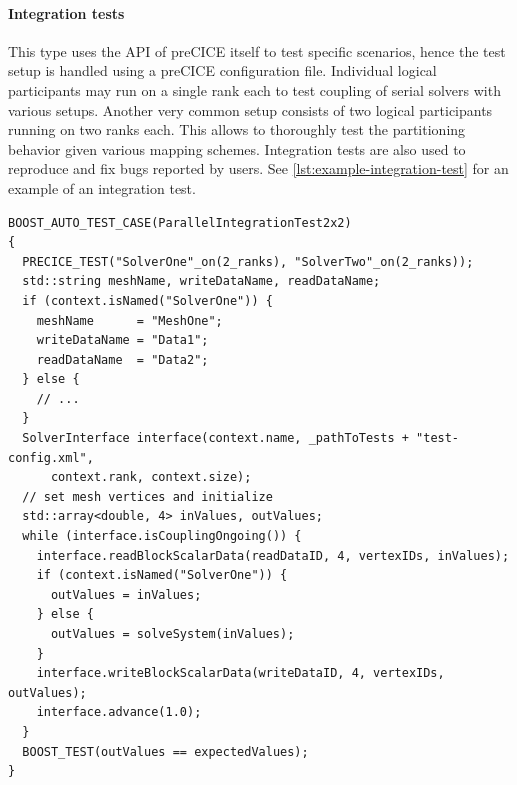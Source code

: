 \paragraph{Integration tests} This type uses the API of preCICE itself to test specific scenarios, hence the test setup is handled using a preCICE configuration file.
Individual logical participants may run on a single rank each to test
coupling of serial solvers with various setups.
Another very common setup consists of two logical participants running on two ranks each.
This allows to thoroughly test the partitioning behavior given various mapping schemes.
Integration tests are also used to reproduce and fix bugs reported by users.
See \autoref{lst:example-integration-test} for an example of an integration test.

\begin{listing}[h!]
\begin{verbatim}
BOOST_AUTO_TEST_CASE(ParallelIntegrationTest2x2)
{
  PRECICE_TEST("SolverOne"_on(2_ranks), "SolverTwo"_on(2_ranks));
  std::string meshName, writeDataName, readDataName;
  if (context.isNamed("SolverOne")) {
    meshName      = "MeshOne";
    writeDataName = "Data1";
    readDataName  = "Data2";
  } else {
    // ...
  }
  SolverInterface interface(context.name, _pathToTests + "test-config.xml",
      context.rank, context.size);
  // set mesh vertices and initialize
  std::array<double, 4> inValues, outValues;
  while (interface.isCouplingOngoing()) {
    interface.readBlockScalarData(readDataID, 4, vertexIDs, inValues);
    if (context.isNamed("SolverOne")) {
      outValues = inValues;
    } else {
      outValues = solveSystem(inValues);
    }
    interface.writeBlockScalarData(writeDataID, 4, vertexIDs, outValues);
    interface.advance(1.0);
  }
  BOOST_TEST(outValues == expectedValues);
}
\end{verbatim}
\caption{%
  Example integration test involving two parallel participants  and  running on two ranks each.
  The  object provides information about the identity of the current rank.
  This information is used to setup further local information such as mesh and data names.
  Integration tests then directly construct a  and use preCICE API calls to run the test.
}
\label{lst:example-integration-test}
\end{listing}

